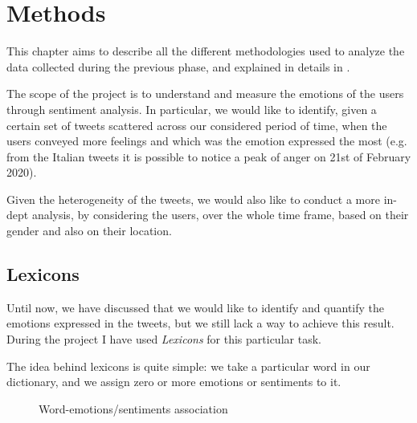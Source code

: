 \graphicspath{{chapters/chapter3/img/}}

\chapter{Methods}
\label{cha:methods}

This chapter aims to describe all the different methodologies used to analyze the data collected during the previous phase, and explained in details in . 

The scope of the project is to understand and measure the emotions of the users through sentiment analysis. In particular, we would like to identify, given a certain set of tweets scattered across our considered period of time, when the users conveyed more feelings and which was the emotion expressed the most (e.g. from the Italian tweets it is possible to notice a peak of anger on 21st of February 2020).

Given the heterogeneity of the tweets, we would also like to conduct a more in-dept analysis, by considering the users, over the whole time frame, based on their gender and also on their location.

\section{Lexicons}
\label{sec:lexicons}

Until now, we have discussed that we would like to identify and quantify the emotions expressed in the tweets, but we still lack a way to achieve this result. During the project I have used \textit{Lexicons} for this particular task.

The idea behind lexicons is quite simple: we take a particular word in our dictionary, and we assign zero or more emotions or sentiments to it.
\begin{figure}[H]
	\centering
	\caption{Word-emotions/sentiments association}
	\label{fig:word-association}
\end{figure}

